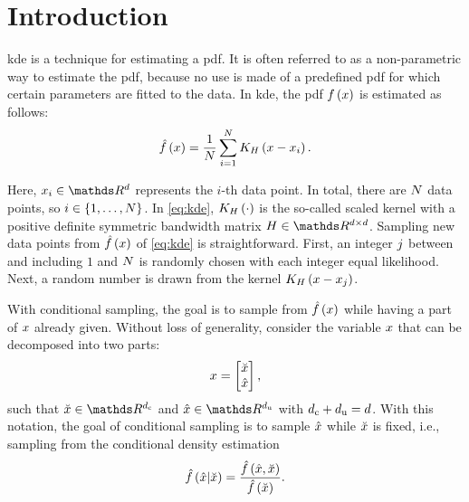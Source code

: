 \section{Introduction}
\label{sec:introduction}

\ac{kde} \autocite{parzen1962estimation, rosenblatt1956remarks} is a technique for estimating a \ac{pdf}. 
It is often referred to as a non-parametric way to estimate the \ac{pdf}, because no use is made of a predefined \ac{pdf} for which certain parameters are fitted to the data. 
In \ac{kde}, the \ac{pdf} $f\left( x \right)$ is estimated as follows:
\begin{equation}
	\label{eq:kde}
	\hat{f}\left( x \right) = 
	\frac{1}{N} \sum_{i=1}^{N} 
	K_{H} \left( x - x_{i} \right).
\end{equation}

Here, $\datapoint{\indexdata} \in \realnumbers^{\dimension}$ represents the $i$-th data point.
In total, there are $N$ data points, so $i \in \{1, \ldots, N\}$.
In \cref{eq:kde}, $K_{H} \left( \cdot \right)$ is the so-called scaled kernel with a positive definite symmetric bandwidth matrix $\bandwidthmatrix \in \realnumbers^{\dimension \times \dimension}$.
Sampling new data points from $\hat{f}\left( x \right)$ of \cref{eq:kde} is straightforward.
First, an integer $j$ between and including $1$ and $N$ is randomly chosen with each integer equal likelihood. 
Next, a random number is drawn from the kernel $K_{H} \left( x - x_{j} \right)$.

With conditional sampling, the goal is to sample from $\hat{f}\left( x \right)$ while having a part of $x$ already given. 
Without loss of generality, consider the variable $x$ that can be decomposed into two parts:
\begin{equation}
	\label{eq:decomposition}
	x = \begin{bmatrix}
		\breve{x} \\ \hat{x}
	\end{bmatrix},
\end{equation}
such that $\variableparta \in \realnumbers^{\dimensionparta}$ and $\variablepartb \in \realnumbers^{\dimensionpartb}$ with $d_\mathrm{c} + d_\mathrm{u} = d$.
With this notation, the goal of conditional sampling is to sample $\hat{x}$ while $\breve{x}$ is fixed, i.e., sampling from the conditional density estimation
\begin{equation}
	\label{eq:conditional density}
	\hat{f}\left(  \hat{x} | \breve{x}  \right)
	= \frac{\hat{f}\left( \hat{x}, \breve{x} \right)}{\hat{f}\left( \breve{x} \right)}.
\end{equation}

